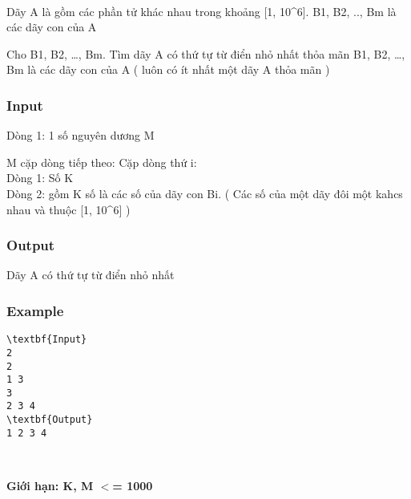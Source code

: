 

 

Dãy A là gồm các phần tử khác nhau trong khoảng [1, 10\textasciicircum6]. B1, B2, .., Bm là các dãy con của A

Cho B1, B2, …, Bm. Tìm dãy A có thứ tự từ điển nhỏ nhất thỏa mãn B1, B2, …, Bm là các dãy con của A ( luôn có ít nhất một dãy A thỏa mãn )

\subsubsection{Input}

Dòng 1: 1 số nguyên dương M

M cặp dòng tiếp theo: Cặp dòng thứ i:
\\Dòng 1: Số K
\\Dòng 2: gồm K số là các số của dãy con Bi. ( Các số của một dãy đôi một kahcs nhau và thuộc [1, 10\textasciicircum6] )

\subsubsection{Output}

Dãy A có thứ tự từ điển nhỏ nhất

\subsubsection{Example}
\begin{verbatim}
\textbf{Input}
2
2
1 3
3
2 3 4
\textbf{Output}
1 2 3 4\end{verbatim}

 

\textbf{Giới hạn: K, M $<$= 1000}